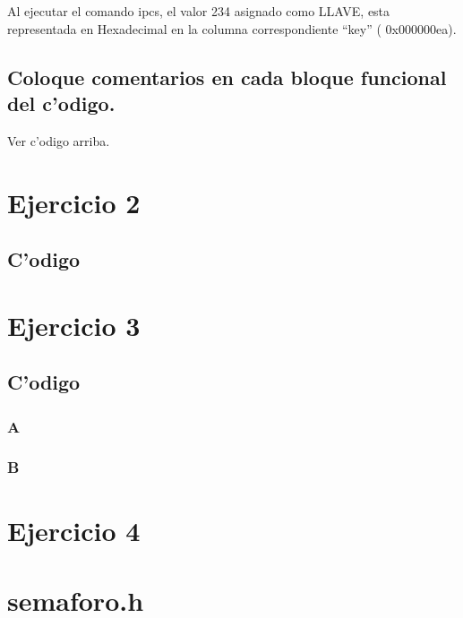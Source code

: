 \documentclass[a4paper,11pt]{article}
\newcommand{\?}{?`}
\begin{document}
Al ejecutar el comando ipcs, el valor 234 asignado como LLAVE, esta representada en Hexadecimal en la columna correspondiente ``key'' ( 0x000000ea).

\subsection[Punto F]{Coloque comentarios en cada bloque funcional del c'odigo.}

Ver c'odigo arriba.

\section{Ejercicio 2}
\subsection{C'odigo}


\section{Ejercicio 3}
\subsection{C'odigo}
\subsubsection{A}


\subsubsection{B}


\section{Ejercicio 4}
%

\appendix
\section{semaforo.h}

\end{document}
